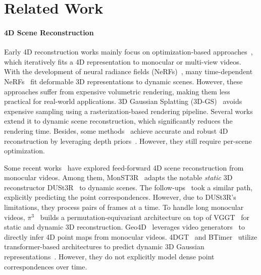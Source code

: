 \section{Related Work}
\label{sec:related}

\paragraph{4D Scene Reconstruction}
Early 4D reconstruction works mainly focus on optimization-based approaches~\cite{newcombe2015dynamicfusion,pumarola2021d,li2021neural,du2021neural,tretschk2021non,park2021nerfies,fridovich2023k,cao2023hexplane,li2023dynibar,Wu_2024_CVPR,yang2024deformable,yang2024real,som2024,wang2025freetimegs},
which iteratively fits a 4D representation to monocular or multi-view videos.
With the development of neural radiance fields (NeRFs)~\cite{mildenhall2020nerf},
many time-dependent NeRFs~\cite{park2021nerfies,du2021neural,li2021neural,pumarola2021d,fridovich2023k,cao2023hexplane,li2023dynibar}
fit deformable 3D representations to dynamic scenes.
However, these approaches suffer from expensive volumetric rendering,
making them less practical for real-world applications.
3D Gaussian Splatting (3D-GS)~\cite{kerbl20233d} avoids expensive sampling using a rasterization-based rendering pipeline.
Several works~\cite{Wu_2024_CVPR,yang2024deformable,yang2024real,som2024,zhu2024motiongs,lu2024dn,wang2025freetimegs}
extend it to dynamic scene reconstruction,
which significantly reduces the rendering time.
Besides,
some methods~\cite{Zhang2022StructureAM,li2025_megasam,lu2025trackingworld} achieve accurate and robust 4D reconstruction by leveraging depth priors~\cite{hu2024-DepthCrafter,ke2024repurposing,piccinelli2024unidepth,yang2024depth,lihe24DAV2}.
However, they still require per-scene optimization.

Some recent works~\cite{zhang24monst3r,jin2024stereo4d,wang2025continuous,sucar2025dynamic,st4rtrack2025,jiang2025geo4d,xu20254dgt,AETHER,chen2025back,liang2024feed} have explored feed-forward 4D scene reconstruction from monocular videos.
Among them,
MonST3R~\cite{zhang24monst3r} adapts the notable \emph{static} 3D reconstructor DUSt3R~\cite{wang2024dust3r} to dynamic scenes.
The follow-ups~\cite{jin2024stereo4d,wang2025continuous,sucar2025dynamic,st4rtrack2025,AETHER,lu2025align3r}
took a similar path, explicitly predicting the point correspondences.
However, due to DUSt3R's limitations, they process pairs of frames at a time.
To handle long monocular videos,
$\pi^3$~\cite{wang2025pi} builds a permutation-equivariant architecture on top of VGGT~\cite{wang2025vggt} for static and dynamic 3D reconstruction.
Geo4D~\cite{jiang2025geo4d} leverages video generators~\cite{xing2024dynamicrafter} to directly infer 4D point maps from monocular videos.
4DGT~\cite{xu20254dgt} and BTimer~\cite{liang2024feed} utilize transformer-based architectures to predict dynamic 3D Gaussian representations~\cite{kerbl20233d}.
However, they do not explicitly model dense point correspondences over time.

